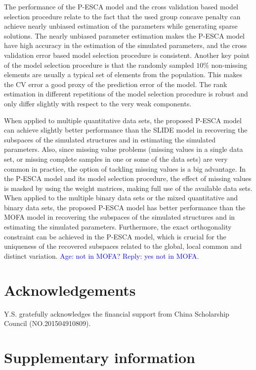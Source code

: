 The performance of the P-ESCA model and the cross validation based model selection procedure relate to the fact that the used group concave penalty can achieve nearly unbiased estimation of the parameters while generating sparse solutions. The nearly unbiased parameter estimation makes the P-ESCA model have high accuracy in the estimation of the simulated parameters, and the cross validation error based model selection procedure is consistent. Another key point of the model selection procedure is that the randomly sampled $10\%$ non-missing elements are usually a typical set of elements from the population. This makes the CV error a good proxy of the prediction error of the model. The rank estimation in different repetitions of the model selection procedure is robust and only differ slightly with respect to the very weak components.

When applied to multiple quantitative data sets, the proposed P-ESCA model can achieve slightly better performance than the SLIDE model in recovering the subspaces of the simulated structures and in estimating the simulated parameters. Also, since missing value problems (missing values in a single data set, or missing complete samples in one or some of the data sets) are very common in practice, the option of tackling missing values is a big advantage. In the P-ESCA model and its model selection procedure, the effect of missing values is masked by using the weight matrices, making full use of the available data sets. When applied to the multiple binary data sets or the mixed quantitative and binary data sets, the proposed P-ESCA model has better performance than the MOFA model in recovering the subspaces of the simulated structures and in estimating the simulated parameters. Furthermore, the exact orthogonality constraint can be achieved in the P-ESCA model, which is crucial for the uniqueness of the recovered subspaces related to the global, local common and distinct variation. \textcolor{blue}{Age: not in MOFA? Reply: yes not in MOFA}.

\section*{Acknowledgements}
Y.S. gratefully acknowledges the financial support from China Scholarship Council (NO.201504910809).

\clearpage
\section{Supplementary information}

